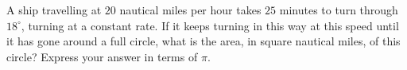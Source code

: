 A ship travelling at $20$ nautical miles per hour takes $25$ minutes to turn through $18^\circ$, turning at a constant rate. If it keeps turning in this way at this speed until it has gone around a full circle, what is the area, in square nautical miles, of this circle? Express your answer in terms of $\pi$.
